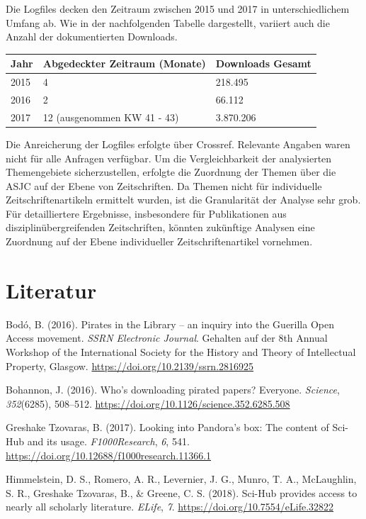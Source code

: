 \documentclass[a4paper,
fontsize=11pt,
oneside,
numbers=noperiodatend,
parskip=half-,
bibliography=totoc,
final
]{scrartcl}
\begin{document}
Die Logfiles decken den Zeitraum zwischen 2015 und 2017 in
unterschiedlichem Umfang ab. Wie in der nachfolgenden Tabelle
dargestellt, variiert auch die Anzahl der dokumentierten Downloads.

\begin{longtable}[]{@{}lll@{}}
\toprule
Jahr & Abgedeckter Zeitraum (Monate) & Downloads Gesamt\tabularnewline
\midrule
\endhead
2015 & 4 & 218.495\tabularnewline
2016 & 2 & 66.112\tabularnewline
2017 & 12 (ausgenommen KW 41 - 43) & 3.870.206\tabularnewline
\bottomrule
\end{longtable}

Die Anreicherung der Logfiles erfolgte über Crossref. Relevante Angaben
waren nicht für alle Anfragen verfügbar. Um die Vergleichbarkeit der
analysierten Themengebiete sicherzustellen, erfolgte die Zuordnung der
Themen über die ASJC auf der Ebene von Zeitschriften. Da Themen nicht
für individuelle Zeitschriftenartikeln ermittelt wurden, ist die
Granularität der Analyse sehr grob. Für detailliertere Ergebnisse,
insbesondere für Publikationen aus disziplinübergreifenden
Zeitschriften, könnten zukünftige Analysen eine Zuordnung auf der Ebene
individueller Zeitschriftenartikel vornehmen.

\hypertarget{literatur}{%
\section{Literatur}\label{literatur}}

Bodó, B. (2016). Pirates in the Library -- an inquiry into the Guerilla
Open Access movement. \emph{SSRN Electronic Journal}. Gehalten auf der
8th Annual Workshop of the International Society for the History and
Theory of Intellectual Property, Glasgow.
\url{https://doi.org/10.2139/ssrn.2816925}

Bohannon, J. (2016). Who's downloading pirated papers? Everyone.
\emph{Science}, \emph{352}(6285), 508--512.
\url{https://doi.org/10.1126/science.352.6285.508}

Greshake Tzovaras, B. (2017). Looking into Pandora's box: The content of
Sci-Hub and its usage. \emph{F1000Research}, \emph{6}, 541.
\url{https://doi.org/10.12688/f1000research.11366.1}

Himmelstein, D. S., Romero, A. R., Levernier, J. G., Munro, T. A.,
McLaughlin, S. R., Greshake Tzovaras, B., \& Greene, C. S. (2018).
Sci-Hub provides access to nearly all scholarly literature.
\emph{ELife}, \emph{7}. \url{https://doi.org/10.7554/eLife.32822}
\end{document}
